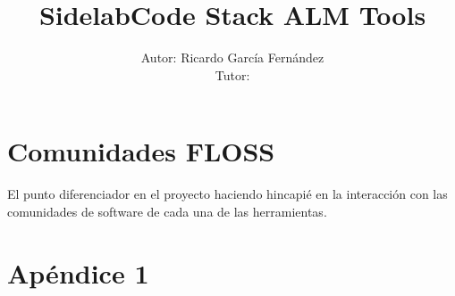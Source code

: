 \documentclass[a4paper, 12pt]{book}
\title{\textbf{SidelabCode Stack ALM Tools}}
\author{Autor: Ricardo Garc\'ia Fern\'andez
\\Tutor: }
\begin{document}
\renewcommand{\refname}{Bibliograf\'ia}  %
\renewcommand{\appendixname}{Ap\'endice}





\tableofcontents  %

\newpage





















\chapter{Comunidades FLOSS}
\label{chap:comunidades}

\par El punto diferenciador en el proyecto haciendo hincapi\'e en la interacci\'on con las comunidades de software de cada una de las herramientas.








\appendix
\chapter{Apéndice 1}
\label{app:primer}
\end{document}

